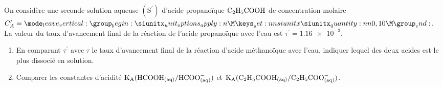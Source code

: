 On considère une seconde solution aqueuse $\mathrm{(S^{\prime})}$ d'acide
propanoïque $\ce{C2H5COOH}$ de concentration molaire
$C_{A}^{\prime}=\qty{0,10}{\M}$. La valeur du taux d'avancement final de la
réaction de l'acide propanoïque avec l'eau est $\tau^{\prime}=\num{1,16e-3}$.
\begin{enumerate}
    \item En comparant $\tau^{\prime}$ avec $\tau$ le taux d'avancement final de
          la réaction d'acide méthanoïque avec l'eau, indiquer lequel des deux
          acides est le plus dissocié en solution.
    \item Comparer les constantes d'acidité
          $\mathrm{K_{A}}(\ce{HCOOH_{(aq)}}/\ce{HCOO^-_{(aq)}})$ et
          $\mathrm{K_{A}}(\ce{C2H5COOH_{(aq)}}/\ce{C2H5COO^-_{(aq)}})$.
\end{enumerate}

